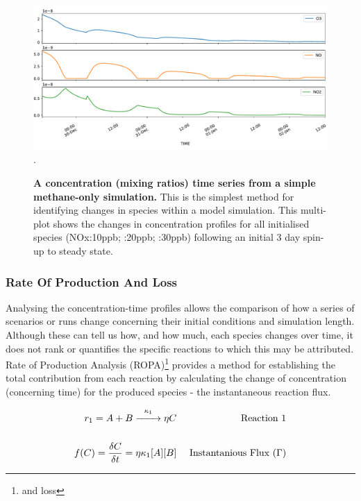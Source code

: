 \begin{figure}[H]
     \centering
         \includegraphics[width=.85\textwidth]{figures/ch2concentration.pdf}\\
         .
        \caption{\textbf{A concentration (mixing ratios) time series from a simple methane-only simulation.} This is the simplest method for identifying changes in species within a model simulation. This multi-plot shows the changes in concentration profiles for all initialised species (NOx:10ppb; :20ppb; :30ppb) following an initial 3 day spin-up to steady state. }
        \label{fig:concentration}
\end{figure}

\subsubsection{Rate Of Production And Loss}\label{sec:ropa}

Analysing the concentration-time profiles allows the comparison of how a series of scenarios or runs change concerning their initial conditions and simulation length. Although these can tell us how, and how much, each species changes over time, it does not rank or quantifies the specific reactions to which this may be attributed. Rate of Production Analysis (ROPA)\footnote{and loss} provides a method for establishing the total contribution from each reaction by calculating the change of concentration (concerning time) for the produced species - the instantaneous reaction flux.

\begin{eqnarray}
  r_1 = A + B \overset{\kappa_1}{\xrightarrow{\hspace*{7mm}}} \eta C & & \text{ Reaction 1}\\[15pt]
  f(C) = \dfrac{\delta C}{\delta t} =  \eta  \kappa_1 [A][B]                     & & \text{ Instantanious Flux }(\Gamma) \label{eqn:ode}
\end{eqnarray}

